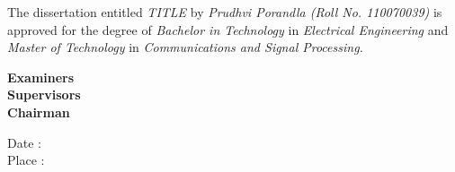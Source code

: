 \vspace{0.2in}

 The dissertation entitled \textit{TITLE} by \textit{Prudhvi Porandla (Roll No. 110070039)} is approved for the degree of \textit{Bachelor in Technology} in \textit{Electrical Engineering} and \textit{Master of Technology} in \textit{Communications and Signal Processing.}


\vspace{0.1in}
\begin{flushright}
\textbf{Examiners} \\
\vspace{1.5in}
\textbf{Supervisors}\\
\vspace{1.5in}
 \textbf{Chairman}\\

\end{flushright}
\vspace{0.7in}
Date :    \\
Place :\\
%

